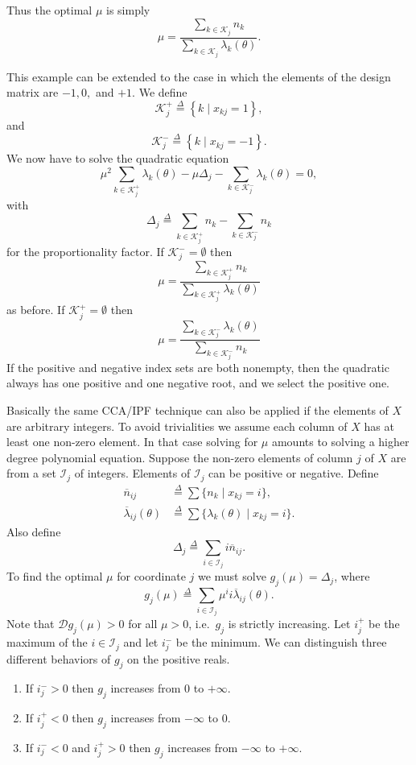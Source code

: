 \documentclass[
  12pt,
]{book}
\providecommand{\tightlist}{%
  \setlength{\itemsep}{0pt}\setlength{\parskip}{0pt}}
\begin{document}
Thus the optimal \(\mu\) is simply
\[
\mu={\frac{\sum_{k\in\mathcal{K}_j}n_k}{\sum_{k\in\mathcal{K}_j}\lambda_k(\theta)}}.
\]

This example can be extended to the case in which the elements of the design matrix
are \(-1,0,\)
and \(+1.\) We define
\[
\mathcal{K}_j^+\mathop{=}\limits^{\Delta}\left\{k\mid x_{kj}=1\right\},
\]
and
\[
\mathcal{K}_j^-\mathop{=}\limits^{\Delta}\left\{k\mid x_{kj}=-1\right\}.
\]
We now have to solve the quadratic equation
\[
\mu^2\sum_{k\in\mathcal{K}_j^+}\lambda_k(\theta)-\mu\Delta_j-\sum_{k\in\mathcal{K}_j^-}\lambda_k(\theta)=0,
\]
with
\[
\Delta_j\mathop{=}\limits^{\Delta}\sum_{k\in\mathcal{K}_j^+}n_k-\sum_{k\in\mathcal{K}_j^-}n_k
\]
for the proportionality factor. If \(\mathcal{K}_j^-=\emptyset\) then
\[
\mu={\frac{\sum_{k\in\mathcal{K}_j^+}n_k}{\sum_{k\in\mathcal{K}_j^+}\lambda_k(\theta)}}
\]
as before. If \(\mathcal{K}_j^+=\emptyset\) then
\[
\mu={\frac{\sum_{k\in\mathcal{K}_j^-}\lambda_k(\theta)}{\sum_{k\in\mathcal{K}_j^-}n_k}}
\]
If the positive and negative index sets are both nonempty, then the quadratic always has one positive and one negative root, and we select the positive one.

Basically the same CCA/IPF technique can also be applied if the elements of \(X\) are arbitrary integers. To avoid trivialities we assume each column of \(X\) has at least one non-zero element. In that case solving for \(\mu\) amounts to solving a higher degree polynomial equation. Suppose the non-zero elements of column \(j\) of \(X\) are from a
set \(\mathcal{I}_j\) of integers. Elements of \(\mathcal{I}_j\)
can be positive or negative. Define
\begin{align*}
\overline{n}_{ij}&\mathop{=}\limits^{\Delta}\sum\{n_k\mid x_{kj}=i\},\\
\overline{\lambda}_{ij}(\theta)&\mathop{=}\limits^{\Delta}
\sum\{\lambda_k(\theta)\mid x_{kj}=i\}.
\end{align*}
Also define
\[
\Delta_j\mathop{=}\limits^{\Delta}\sum_{i\in\mathcal{I}_j}i\overline{n}_{ij}.
\]
To find the optimal \(\mu\) for coordinate \(j\) we must
solve \(g_j(\mu)=\Delta_j\), where
\[
g_j(\mu)\mathop{=}\limits^{\Delta}\sum_{i\in\mathcal{I}_j}\mu^i i\overline{\lambda}_{ij}(\theta).
\]
Note that \(\mathcal{D}g_j(\mu)>0\) for all \(\mu>0\), i.e.~\(g_j\) is strictly increasing. Let \(i_j^+\) be the maximum of the \(i\in\mathcal{I}_j\) and let \(i_j^-\) be the minimum.
We can distinguish three different behaviors of \(g_j\) on the positive reals.

\begin{enumerate}
\def\labelenumi{\arabic{enumi}.}
\tightlist
\item
  If \(i_j^->0\) then \(g_j\) increases from 0 to \(+\infty\).
\item
  If \(i_j^+<0\) then \(g_j\) increases from \(-\infty\) to 0.
\item
  If \(i_j^-<0\) and \(i_j^+>0\) then \(g_j\) increases from \(-\infty\) to \(+\infty\).
\end{enumerate}
\end{document}

